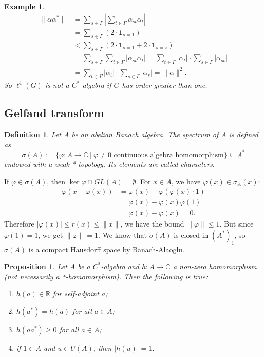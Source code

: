 \documentclass[10pt, a4paper]{article}
\newtheorem{proposition}[thm]{Proposition}
\newtheorem{defi}[thm]{Definition}
\newenvironment{noticeB}{%
  \tcolorbox[%
  notitle,
  empty,
  enhanced,  %
  breakable,
  coltext=black,
  colback=white, 
  fontupper=\rmfamily,
  noparskip,
  sharp corners,
  boxrule=-1pt,  %
  frame hidden,
  left=7pt,  %
  right=7pt,
  top=5pt,
  bottom=5pt,
  before skip=2.5ex plus 2pt,
  after skip=2.5ex plus 2pt,
  borderline west = {1.5pt}{-0.1pt}{blue!30!black}, %
  overlay unbroken and last={%
    \draw[color=black, line width=1.25pt]
    ($(frame.south west)+(1.pt, -0.1pt)$) -- ++(2em, 0);
  }
  ]}
{\endtcolorbox}
\newenvironment{definition}{\begin{noticeB}\begin{defi}}{%
    \end{defi}\end{noticeB}}
\newtheorem{example}[thm]{Example}
\newcommand{\R}{\mathbb {R}}
\newcommand{\C}{\mathbb {C}}
\begin{document}
\begin{example}
\begin{align*}
    \|\alpha \alpha^*\| &= \sum_{s \in \Gamma} \left| \sum_{t \in \Gamma} \alpha_{st} \overline{\alpha_{t}} \right|\\
    &= \sum_{s \in \Gamma} (2 \cdot \mathbf{1}_{s = 1})\\
    &< \sum_{s \in \Gamma} (2 \cdot \mathbf{1}_{s = 1} + 2\cdot \mathbf{1}_{s = z} )\\
    &= \sum_{s \in \Gamma} \sum_{t \in \Gamma} \left| \alpha_{st} {\alpha_{t}} \right| = \sum_{t \in \Gamma}|{\alpha_{t}}| \cdot \sum_{s \in \Gamma}  \left| \alpha_{st}  \right|\\
    &= \sum_{t \in \Gamma} \left|  {\alpha_{t}} \right| \cdot \sum_{s \in \Gamma} |\alpha_{s}| = \| \alpha\|^2.
  \end{align*}
  So $\ell^1 (G)$ is not a $C^*$-algebra if $G$ has order greater than one.
\end{example}

\subsection{Gelfand transform}

\begin{definition}
  Let $A$ be an abelian Banach algebra. The spectrum of $A$ is defined as
  $$\sigma (A) := \{\varphi: A \to \C\ |\ \textrm{$\varphi \neq 0$ continuous algebra homomorphism}\} \subseteq A^*$$
  endowed with a weak-* topology. Its elements are called characters.
\end{definition}

If $\varphi \in \sigma (A)$, then $\ker \varphi \cap GL(A) = \emptyset.$
For $x \in A$, we have $\varphi(x) \in \sigma_A(x)$:
\begin{align*}
  \varphi(x - \varphi(x)) &= \varphi(x) - \varphi(\varphi(x) \cdot 1)\\
  &= \varphi(x) - \varphi(x) \varphi(1)\\
  &= \varphi(x) - \varphi(x) = 0.
\end{align*}
Therefore $|\varphi(x)| \leq r(x)\leq \|x\|$, we have the bound $\|\varphi\| \leq 1$.
But since $\varphi(1) = 1$, we get $\|\varphi\| = 1$.
We know that $\sigma (A)$ is closed in $(A^*)_1$, so $\sigma(A)$ is a compact Hausdorff space by Banach-Alaoglu.

\begin{proposition}
  Let $A$ be a $C^*$-algebra and $h: A \to \C$ a non-zero homomorphism (not necessarily a *-homomorphism). 
  Then the following is true:
  \begin{enumerate}
    \item $h(a) \in \R$ for self-adjoint $a$;
    \item $h(a^*) = \overline{h(a)}$ for all $a \in A$;
    \item $h(a a^*) \geq 0$ for all $a \in A$;
    \item if $1 \in A$ and $u \in U(A)$, then $|h(u)| = 1$. 
  \end{enumerate}
\end{proposition}
\end{document}
